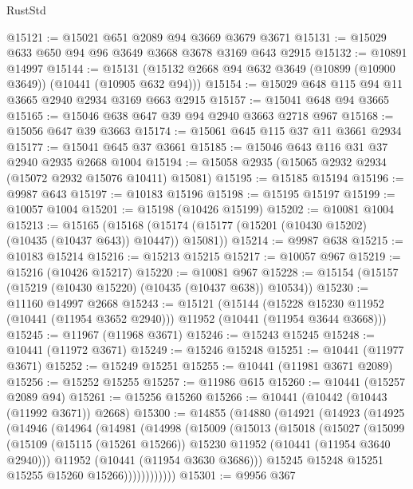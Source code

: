 \begin{lexlean}{RustStd}
\begin{coremodule}
@15121 := @15021 @651 @2089 @94 @3669 @3679 @3671
@15131 := @15029 @633 @650 @94 @96 @3649 @3668 @3678 @3169 @643 @2915
@15132 := @10891 @14997
@15144 := @15131 (@15132 @2668 @94 @632 @3649 (@10899 (@10900 @3649)) (@10441 (@10905 @632 @94)))
@15154 := @15029 @648 @115 @94 @11 @3665 @2940 @2934 @3169 @663 @2915
@15157 := @15041 @648 @94 @3665
@15165 := @15046 @638 @647 @39 @94 @2940 @3663 @2718 @967
@15168 := @15056 @647 @39 @3663
@15174 := @15061 @645 @115 @37 @11 @3661 @2934
@15177 := @15041 @645 @37 @3661
@15185 := @15046 @643 @116 @31 @37 @2940 @2935 @2668 @1004
@15194 := @15058 @2935 (@15065 @2932 @2934 (@15072 @2932 @15076 @10411) @15081)
@15195 := @15185 @15194
@15196 := @9987 @643
@15197 := @10183 @15196
@15198 := @15195 @15197
@15199 := @10057 @1004
@15201 := @15198 (@10426 @15199)
@15202 := @10081 @1004
@15213 := @15165
    (@15168 (@15174 (@15177 (@15201 (@10430 @15202) (@10435 (@10437 @643)) @10447)) @15081))
@15214 := @9987 @638
@15215 := @10183 @15214
@15216 := @15213 @15215
@15217 := @10057 @967
@15219 := @15216 (@10426 @15217)
@15220 := @10081 @967
@15228 := @15154 (@15157 (@15219 (@10430 @15220) (@10435 (@10437 @638)) @10534))
@15230 := @11160 @14997 @2668
@15243 := @15121
    (@15144
      (@15228 @15230 @11952 (@10441 (@11954 @3652 @2940)))
      @11952
      (@10441 (@11954 @3644 @3668)))
@15245 := @11967 (@11968 @3671)
@15246 := @15243 @15245
@15248 := @10441 (@11972 @3671)
@15249 := @15246 @15248
@15251 := @10441 (@11977 @3671)
@15252 := @15249 @15251
@15255 := @10441 (@11981 @3671 @2089)
@15256 := @15252 @15255
@15257 := @11986 @615
@15260 := @10441 (@15257 @2089 @94)
@15261 := @15256 @15260
@15266 := @10441 (@10442 (@10443 (@11992 @3671)) @2668)
@15300 := @14855
    (@14880
      (@14921
        (@14923
          (@14925
            (@14946
              (@14964
                (@14981
                  (@14998
                    (@15009
                      (@15013
                        (@15018
                          (@15027
                            (@15099
                              (@15109
                                (@15115 (@15261 @15266))
                                @15230
                                @11952
                                (@10441 (@11954 @3640 @2940)))
                              @11952
                              (@10441 (@11954 @3630 @3686)))
                            @15245
                            @15248
                            @15251
                            @15255
                            @15260
                            @15266))))))))))))
@15301 := @9956 @367

\end{coremodule}
\end{lexlean}
